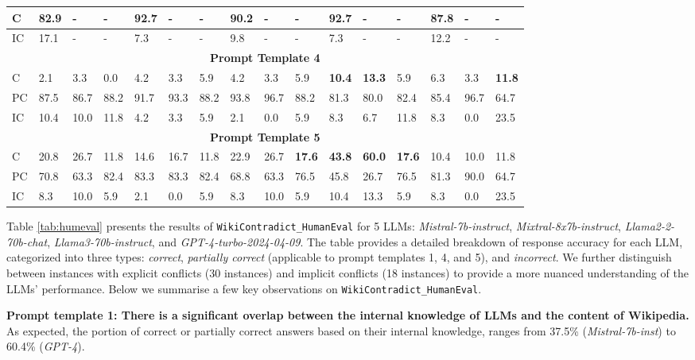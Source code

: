 \begin{table}[t]
\begin{footnotesize}
\begin{tabular}{|p{0.25cm}|p{0.46cm}|p{0.475cm}|p{0.46cm}|p{0.46cm}|p{0.475cm}|p{0.46cm}|p{0.46cm}|p{0.46cm}|p{0.46cm}|p{0.46cm}|p{0.475cm}|p{0.46cm}|p{0.46cm}|p{0.475cm}|p{0.46cm}|}
        C & 82.9 & -& - & \textbf{92.7} & - & - & 90.2 & - & - & \textbf{92.7} & - & - & 87.8 & - & - \\ \hline
        IC & 17.1 & - & - & 7.3 & - & - & 9.8 & - & - & 7.3 & - & - & 12.2 & - & - \\ \hline
         \multicolumn{16}{|c|}{\textbf{Prompt Template 4}} \\ \hline
       C & 2.1 & 3.3 & 0.0 & 4.2 & 3.3 & 5.9 & 4.2 & 3.3 & 5.9 & \textbf{10.4} & \textbf{13.3} & 5.9 & 6.3 & 3.3 & \textbf{11.8} \\ \hline
        PC & 87.5 & 86.7 & 88.2 & 91.7 & 93.3 & 88.2 & 93.8 & 96.7 & 88.2 & 81.3 & 80.0 & 82.4 & 85.4 & 96.7 & 64.7 \\ \hline
        IC & 10.4 & 10.0 & 11.8 & 4.2 & 3.3 & 5.9 & 2.1 & 0.0 & 5.9 & 8.3 & 6.7 & 11.8 & 8.3 & 0.0 & 23.5 \\ \hline
        \multicolumn{16}{|c|}{\textbf{Prompt Template 5}} \\ \hline
        C & 20.8 & 26.7 & 11.8 & 14.6 & 16.7 & 11.8 & 22.9 & 26.7 & \textbf{17.6} & \textbf{43.8} & \textbf{60.0} & \textbf{17.6} & 10.4 & 10.0 & 11.8 \\ \hline
        PC & 70.8 & 63.3 & 82.4 & 83.3 & 83.3 & 82.4 & 68.8 & 63.3 & 76.5 & 45.8 & 26.7 & 76.5 & 81.3 & 90.0 & 64.7 \\ \hline
        IC & 8.3 & 10.0 & 5.9 & 2.1 & 0.0 & 5.9 & 8.3 & 10.0 & 5.9 & 10.4 & 13.3 & 5.9 & 8.3 & 0.0 & 23.5 \\ \hline
        \end{tabular}
    \end{footnotesize}
\end{table}


Table \ref{tab:humeval} presents the results of \texttt{WikiContradict\_HumanEval} for 5 LLMs: \emph{Mistral-7b-instruct}, \emph{Mixtral-8x7b-instruct}, \emph{Llama2-2-70b-chat}, \emph{Llama3-70b-instruct}, and \emph{GPT-4-turbo-2024-04-09}. The table provides a detailed breakdown of response accuracy for each LLM, categorized into three types: \emph{correct}, \emph{partially correct} (applicable to prompt templates 1, 4, and 5), and \emph{incorrect}. We further distinguish between instances with explicit conflicts (30 instances) and implicit conflicts (18 instances) to provide a more nuanced understanding of the LLMs' performance. Below we summarise a few key observations on \texttt{WikiContradict\_HumanEval}.

\textbf{Prompt template 1: There is a significant overlap between the internal knowledge of LLMs and the content of Wikipedia.} As expected, the portion of correct or partially correct answers based on their internal knowledge, ranges from 37.5\% (\emph{Mistral-7b-inst}) to 60.4\% (\emph{GPT-4}). 

